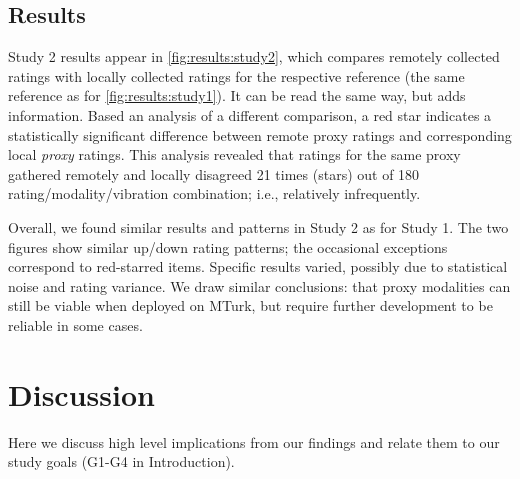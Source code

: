 

\subsection {Results}

Study 2 results appear in \autoref{fig:results:study2},
which compares remotely collected ratings with locally collected ratings for the respective reference (the same reference as for \autoref{fig:results:study1}). It can be read the same way, but adds information.
Based an analysis of a different comparison, a red star indicates a statistically significant difference between remote proxy ratings and corresponding local \textit{proxy} ratings.
This analysis revealed that ratings for the same proxy gathered remotely and locally disagreed 21 times (stars) out of 180 rating/modality/vibration combination; i.e., relatively infrequently.

Overall, we found similar results and patterns in Study 2 as for Study 1. The two figures show similar up/down rating patterns; the occasional exceptions correspond to red-starred items.
Specific results varied, possibly due to statistical noise and rating variance.
We draw similar conclusions: that proxy modalities can still be viable when deployed on MTurk, but require further development to be reliable in some cases.

		
\section{Discussion}
Here we discuss high level implications from our findings and relate them to our study goals (G1-G4 in Introduction).

